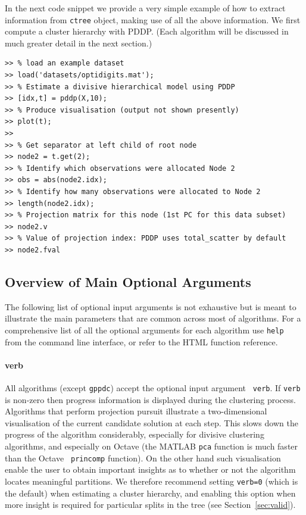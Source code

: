 \documentclass{book}
\begin{document}
\noindent
%
In the next code snippet we provide a very simple example of how to extract information from
{\tt ctree} object, making use of all the above information. We first compute a
cluster hierarchy with PDDP. (Each algorithm will be discussed in much greater detail in the 
next section.) 

\begin{lstlisting}
>> % load an example dataset
>> load('datasets/optidigits.mat');
>> % Estimate a divisive hierarchical model using PDDP
>> [idx,t] = pddp(X,10);
>> % Produce visualisation (output not shown presently)
>> plot(t);
>>
>> % Get separator at left child of root node
>> node2 = t.get(2);
>> % Identify which observations were allocated Node 2
>> obs = abs(node2.idx);
>> % Identify how many observations were allocated to Node 2
>> length(node2.idx);
>> % Projection matrix for this node (1st PC for this data subset)
>> node2.v
>> % Value of projection index: PDDP uses total_scatter by default
>> node2.fval 
\end{lstlisting}


\subsection*{Overview of Main Optional Arguments}


The following list of optional input arguments is not exhaustive but is meant to illustrate the main
parameters that are common across most of algorithms.
For a comprehensive list of all the optional arguments for each algorithm
use {\tt help } from the command line interface, or refer to the HTML
function reference.

\paragraph{verb}
%
All algorithms (except {\tt gppdc}) accept the optional input argument {\tt
verb}. If {\tt verb} is non-zero then progress information is
displayed during the clustering process. Algorithms that perform projection
pursuit illustrate a two-dimensional visualisation of the current candidate
solution at each step. This slows down the progress of the algorithm
considerably, especially for divisive clustering algorithms, and especially on
Octave (the MATLAB {\tt pca} function is much faster than the Octave {\tt
princomp} function). On the other hand such visualisation enable the user to
obtain important insights as to whether or not the algorithm locates meaningful
partitions. We therefore recommend setting {\tt verb=0} (which is the default)
when estimating a cluster hierarchy, and enabling this option when more insight
is required for particular splits in the tree (see Section~\ref{sec:valid}).
\end{document}
